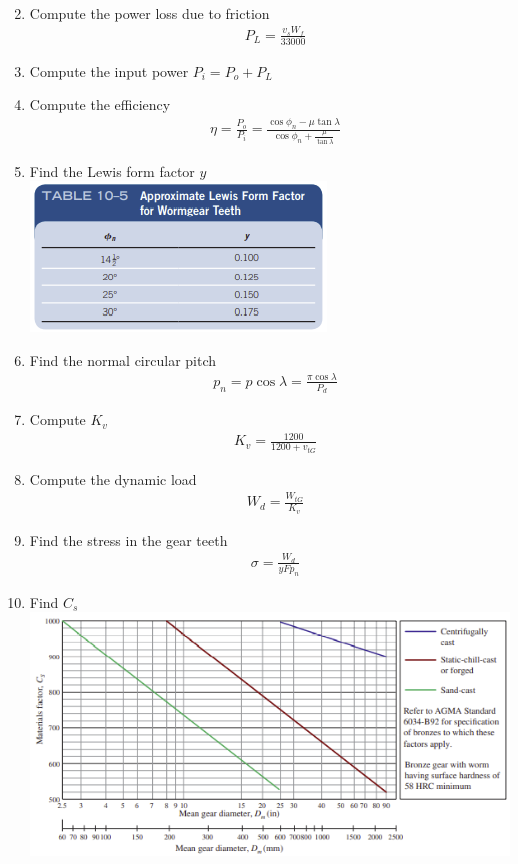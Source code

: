 \documentclass[11pt, fleqn]{article}
\begin{document}
\begin{enumerate}
\begin{align*}
    \end{align*}
    \item Compute the power loss due to friction
    \begin{align*}
        &P_L=\frac{v_sW_f}{33000}
    \end{align*}
    \item Compute the input power $P_i=P_o+P_L$
    \item Compute the efficiency
    \begin{align*}
        &\eta=\frac{P_o}{P_i}=\frac{\cos\phi_n-\mu\tan\lambda}{\cos\phi_n+\frac{\mu}{\tan\lambda}}
    \end{align*}
    \item Find the Lewis form factor $y$\\
    \includegraphics[scale=1]{Gears/10-5.png}
    \item Find the normal circular pitch
    \begin{align*}
        &p_n=p\cos\lambda=\frac{\pi\cos\lambda}{P_d}
    \end{align*}
    \item Compute $K_v$
    \begin{align*}
        &K_v=\frac{1200}{1200+v_{tG}}
    \end{align*}
    \item Compute the dynamic load
    \begin{align*}
        &W_d=\frac{W_{tG}}{K_v}
    \end{align*}
    \item Find the stress in the gear teeth
    \begin{align*}
        &\sigma=\frac{W_d}{yFp_n}
    \end{align*}
    \item Find $C_s$\\
    \includegraphics[scale=1]{Gears/Fig 10-27.png}\\

\end{enumerate}
\end{document}
